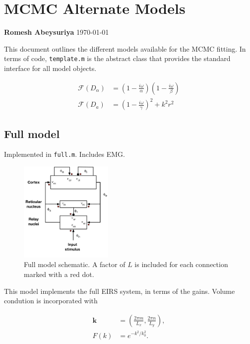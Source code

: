 \documentclass[10pt,a4paper]{article}
\begin{document}
\section{MCMC Alternate Models}
{\bf Romesh Abeysuriya} \today
\sffamily

This document outlines the different models available for the MCMC fitting. In terms of code, {\tt template.m} is the abstract class that provides the standard interface for all model objects. 

\begin{align}
\mathcal{F}(D_\alpha) &= \left(1 - \frac{i\omega}{\alpha}\right)\left(1 - \frac{i\omega}{\beta}\right)\\[16pt]
\mathcal{F}(D_a) &= \left( 1-\frac{i\omega}{\gamma}\right)^2 + k^2r^2
\end{align}

\subsection{Full model}

Implemented in {\tt full.m}. Includes EMG. 

\begin{figure}[h!]
\begin{center}
\includegraphics[width=0.4\textwidth]{full_model}
\caption{Full model schematic. A factor of $L$ is included for each connection marked with a red dot.}
\label{fig:full}
\end{center}
\end{figure}

This model implements the full EIRS system, in terms of the gains. Volume condution is incorporated with

\begin{align}
\mathbf{k} &= \left( \frac{2\pi m}{L_x},\frac{2\pi n}{L_y} \right),\\
F(k) &= e^{-k^2/k_0^2}.
\end{align}
\end{document}
